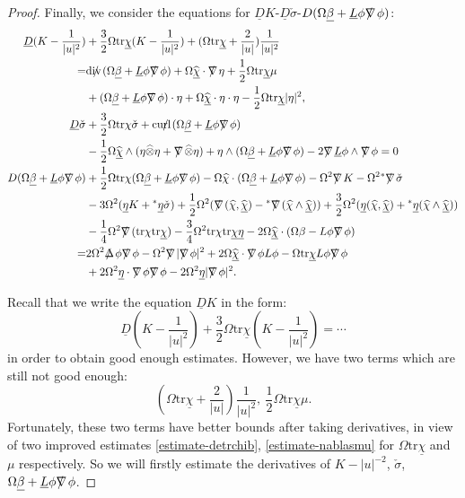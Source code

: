 \documentclass[11pt,reqno]{amsart}
\theoremstyle{definition}
\numberwithin{equation}{section}
\newcommand{\tr}{\mathrm{tr}}
\def\betab{\underline{\beta}}
\def\chib{\underline{\chi}}
\def\chibh{\widehat{\underline{\chi}}}
\def\chih{\widehat{\chi}}
\def\etab{\underline{\eta}}
\def\Lb{\underline{L}}
\def\tr{\mathrm{tr}}
\def\sigmac{\check{\sigma}}
\def\tensor{\widehat{\otimes}}
\newcommand{\Db}{\underline{D}}
\def\nablas{\mbox{$\nabla \mkern -13mu /$ }}
\def\Deltas{\mbox{$\Delta \mkern -13mu /$ }}
\def\divs{\mbox{$\mathrm{div} \mkern -13mu /$ }}
\def\curls{\mbox{$\mathrm{curl} \mkern -13mu /$ }}
\def\ds{\mbox{$\nabla \mkern -13mu /$ }}
\begin{document}
\begin{proof}


Finally, we consider the equations for $\Db K$-$\Db\sigmac$-$D(\Omega\betab+\Lb\phi\nablas\phi)$:
\begin{align*}
\Db(K-\frac{1}{|u|^2})&+\frac{3}{2}\Omega\tr\chib (K-\frac{1}{|u|^2})+(\Omega\tr\chib+\frac{2}{|u|})\frac{1}{|u|^2}\\
=&\divs(\Omega\betab+\Lb\phi\nablas\phi)+\Omega\chibh\cdot\nablas\eta+\frac{1}{2}\Omega\tr\chib\mu\\
&+(\Omega\betab+\Lb\phi\nablas\phi)\cdot\eta+\Omega\chibh\cdot\eta\cdot\eta-\frac{1}{2}\Omega\tr\chib|\eta|^2,\\
\Db\sigmac&+\frac{3}{2}\Omega\tr\chi\sigmac+\curls(\Omega\betab+\Lb\phi\nablas\phi)\\
&-\frac{1}{2}\Omega\chibh\wedge(\eta\tensor\eta+\nablas\tensor\eta)+\eta\wedge(\Omega\betab+\Lb\phi\nablas\phi)-2\nablas \Lb\phi\wedge\nablas\phi=0\\
D(\Omega\betab+\Lb\phi\nablas\phi)&+\frac{1}{2}\Omega\tr\chi(\Omega\betab+\Lb\phi\nablas\phi)-\Omega\chih\cdot(\Omega\betab+\Lb\phi\nablas\phi)-\Omega^2\ds K-\Omega^2{}^*\ds\sigmac\\
&-3\Omega^2(\etab K+{}^*\etab\sigmac)+\frac{1}{2}\Omega^2(\ds(\chih,\chibh)-{}^*\ds(\chih\wedge\chibh))+\frac{3}{2}\Omega^2(\etab(\chih,\chibh)+{}^*\etab(\chih\wedge\chibh))\\
&-\frac{1}{4}\Omega^2\ds(\tr\chi\tr\chib)-\frac{3}{4}\Omega^2\tr\chi\tr\chib\etab-2\Omega\chibh\cdot(\Omega\beta-L\phi\nablas\phi)\\
=&2\Omega^2\Deltas\phi\nablas\phi-\Omega^2\ds|\ds\phi|^2+2\Omega\chibh\cdot\nablas\phi L\phi-\Omega\tr\chib L\phi\nablas\phi\\
&+2\Omega^2\etab\cdot\nablas\phi\nablas\phi-2\Omega^2\etab|\ds\phi|^2.
\end{align*}

Recall that we write the equation $\Db K$ in the form:
$$\Db(K-\frac{1}{|u|^2})+\frac{3}{2}\Omega\tr\chib (K-\frac{1}{|u|^2})=\cdots$$
in order to obtain good enough estimates. However, we have two terms which are still not good enough:
$$(\Omega\tr\chib+\frac{2}{|u|})\frac{1}{|u|^2},\ \frac{1}{2}\Omega\tr\chib\mu.$$
Fortunately, these two terms have better bounds after taking derivatives, in view of two improved estimates \eqref{estimate-detrchib}, \eqref{estimate-nablasmu} for $\Omega\tr\chib$ and $\mu$ respectively. So we will firstly estimate the derivatives of $K-|u|^{-2}$, $\sigmac$, $\Omega\betab+\Lb\phi\nablas\phi$. 



\end{proof}
\end{document}
